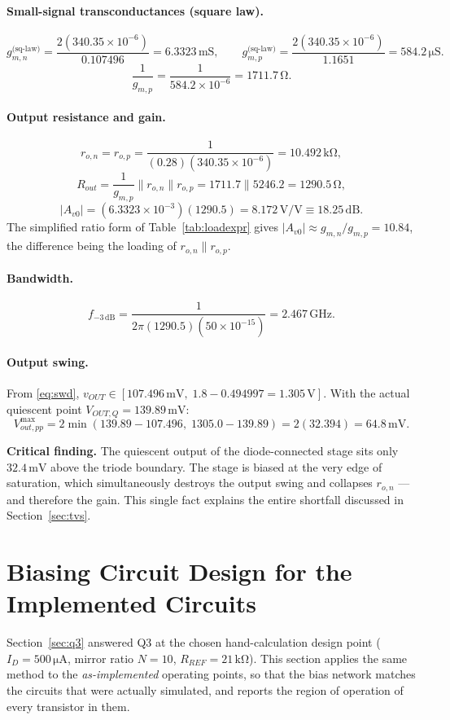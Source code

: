 \documentclass[12pt,a4paper]{article}
\newcommand{\U}[1]{\,\mathrm{#1}}
\newenvironment{keybox}
  {\par\vspace{4pt}\noindent
   \begin{lrbox}{\keyboxreg}\begin{minipage}{0.945\textwidth}\small\vspace{2pt}}
  {\vspace{2pt}\end{minipage}\end{lrbox}%
   \fcolorbox{boxrule}{boxbg}{\usebox{\keyboxreg}}\par\vspace{4pt}}
\begin{document}
\paragraph{Small-signal transconductances (square law).}
\[
g_{m,n}^{\text{(sq-law)}} = \frac{2(340.35\times10^{-6})}{0.107496} = 6.3323\U{mS},
\qquad
g_{m,p}^{\text{(sq-law)}} = \frac{2(340.35\times10^{-6})}{1.1651} = 584.2\U{\mu S}.
\]
\[
\frac{1}{g_{m,p}} = \frac{1}{584.2\times10^{-6}} = 1711.7\U{\Omega}.
\]

\paragraph{Output resistance and gain.}
\[
r_{o,n}=r_{o,p}=\frac{1}{(0.28)(340.35\times10^{-6})} = 10.492\U{k\Omega},
\]
\[
R_{out} = \frac{1}{g_{m,p}} \parallel r_{o,n} \parallel r_{o,p}
        = 1711.7 \parallel 5246.2 = 1290.5\U{\Omega},
\]
\[
|A_{v0}| = (6.3323\times10^{-3})(1290.5) = 8.172\U{V/V} \equiv 18.25\U{dB}.
\]
The simplified ratio form of Table~\ref{tab:loadexpr} gives
$|A_{v0}|\approx g_{m,n}/g_{m,p} = 10.84$, the difference being the loading of
$r_{o,n}\parallel r_{o,p}$.

\paragraph{Bandwidth.}
\[
f_{-3\U{dB}} = \frac{1}{2\pi(1290.5)(50\times10^{-15})} = 2.467\U{GHz}.
\]

\paragraph{Output swing.}
From \eqref{eq:swd}, $v_{OUT}\in[107.496\U{mV},\;1.8-0.494997=1.305\U{V}]$.
With the actual quiescent point $V_{OUT,Q} = 139.89\U{mV}$:
\[
V_{out,pp}^{\max} = 2\min(139.89-107.496,\;1305.0-139.89)
                  = 2(32.394) = 64.8\U{mV}.
\]
\begin{keybox}
\textbf{Critical finding.} The quiescent output of the diode-connected stage
sits only $32.4\U{mV}$ above the triode boundary. The stage is biased at the
very edge of saturation, which simultaneously destroys the output swing and
collapses $r_{o,n}$ --- and therefore the gain. This single fact explains the
entire shortfall discussed in Section~\ref{sec:tvs}.
\end{keybox}

\section{Biasing Circuit Design for the Implemented Circuits}
\label{sec:biasimpl}
Section~\ref{sec:q3} answered Q3 at the chosen hand-calculation design point
($I_D = 500\U{\mu A}$, mirror ratio $N=10$, $R_{REF}=21\U{k\Omega}$). This
section applies the same method to the \emph{as-implemented} operating points,
so that the bias network matches the circuits that were actually simulated, and
reports the region of operation of every transistor in them.
\end{document}
